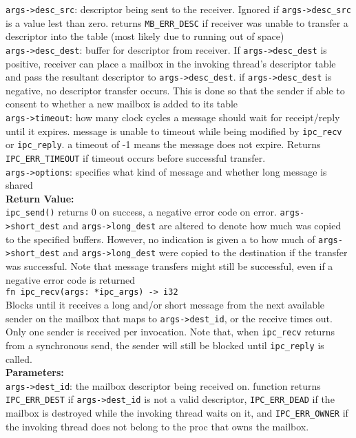 \documentclass{article}
\begin{document}
 \verb|args->desc_src|: descriptor being sent to the receiver.  Ignored if \verb|args->desc_src| is a value lest than zero.  returns \verb|MB_ERR_DESC| if receiver was unable to transfer a descriptor into the table (most likely due to running out of space)\\
 
 \verb|args->desc_dest|: buffer for descriptor from receiver.  If \verb|args->desc_dest| is positive, receiver
 can place a mailbox in the invoking thread's descriptor table and pass the
 resultant descriptor to \verb|args->desc_dest|.  if \verb|args->desc_dest| is negative, no
 descriptor transfer occurs.  This is done so that the sender if able to
 consent to whether a new mailbox is added to its table \\
 
 \verb|args->timeout|: how many clock cycles a message should wait for receipt/reply
 until it expires.  message is unable to timeout while being modified by
 \verb|ipc_recv| or \verb|ipc_reply|.  a timeout of -1 means the message does not expire.
  Returns \verb|IPC_ERR_TIMEOUT| if timeout occurs before successful transfer.\\

 \verb|args->options|: specifies what kind of message and whether long message is shared\\



\textbf{Return Value:}\\
 \verb|ipc_send()| returns 0 on success, a negative error code on error.  \verb|args->short_dest| and \verb|args->long_dest| are altered to denote how much was copied to the specified buffers.  However, no indication is given a to how much of \verb|args->short_dest| and \verb|args->long_dest| were copied to the destination if the transfer was successful. Note that message transfers might still be successful, even if a negative
 error code is returned \\

\verb|fn ipc_recv(args: *ipc_args) -> i32|\\
Blocks until it receives a long and/or short message from the next available sender on the mailbox that maps to \verb|args->dest_id|, or the receive times out.  Only one sender is received per invocation. Note that, when \verb|ipc_recv| returns from a synchronous send, the sender will still be blocked until \verb|ipc_reply| is called. \\

\textbf{Parameters:}\\
\verb|args->dest_id|: the mailbox descriptor being received on.  function returns \verb|IPC_ERR_DEST| if
 \verb|args->dest_id| is not a valid descriptor, \verb|IPC_ERR_DEAD| if the mailbox is
destroyed while the invoking thread waits on it, and \verb|IPC_ERR_OWNER| if the
invoking thread does not belong to the proc that owns the mailbox. \\
 
\end{document}
